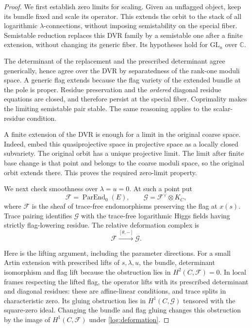 \begin{proof}
We first establish zero limits for scaling.  Given an unflagged object,
keep its bundle fixed and scale its operator.  This extends the orbit to
the stack of all logarithmic $\lambda$-connections, without imposing
semistability on the special fiber.  Semistable reduction
\cite[Proposition~4.48]{FHZ2025} replaces this DVR family by a semistable
one after a finite extension, without changing its generic fiber.
Its hypotheses hold for $\mathrm{GL}_n$ over $\mathbb C$.

The determinant of the replacement and the prescribed determinant agree
generically, hence agree over the DVR by separatedness of the rank-one
moduli space.  A generic flag extends because the flag variety of the
extended bundle at the pole is proper.  Residue preservation and the
\emph{ordered} diagonal residue equations are closed, and therefore
persist at the special fiber.  Coprimality makes the limiting semistable
pair stable.  The same reasoning applies to the scalar-residue condition.

A finite extension of the DVR is enough for a limit in the original
coarse space.  Indeed, embed this quasiprojective space in projective
space as a locally closed subvariety.  The original orbit has a unique
projective limit.  The limit after finite base change is that point and
belongs to the coarse moduli space, so the original orbit extends there.
This proves the required zero-limit property.

We next check smoothness over $\lambda=u=0$.  At such a point put
\[
 \mathcal F=\operatorname{ParEnd}_0(E),\qquad
 \mathcal G=\mathcal F^\vee\otimes K_C,
\]
where $\mathcal F$ is the sheaf of trace-free endomorphisms preserving
the flag at $x(s)$.  Trace pairing identifies $\mathcal G$ with the
trace-free logarithmic Higgs fields having strictly flag-lowering
residue.  The relative deformation complex is
\begin{equation}
 \mathcal F\xrightarrow{[\theta,-]}\mathcal G.
 \label{log:deformation}
\end{equation}

Here is the lifting argument, including the parameter directions.
For a small Artin extension with prescribed lifts of $s,\lambda,u$, the
bundle, determinant isomorphism and flag lift because the obstruction
lies in $H^2(C,\mathcal F)=0$.  In local frames respecting the lifted
flag, the operator lifts with its prescribed determinant and diagonal
residues: these are affine-linear conditions, and trace splits in
characteristic zero.  Its gluing obstruction lies in
$H^1(C,\mathcal G)$ tensored with the square-zero ideal.  Changing the
bundle and flag gluing changes this obstruction by the image of
$H^1(C,\mathcal F)$ under \eqref{log:deformation}.


\end{proof}
